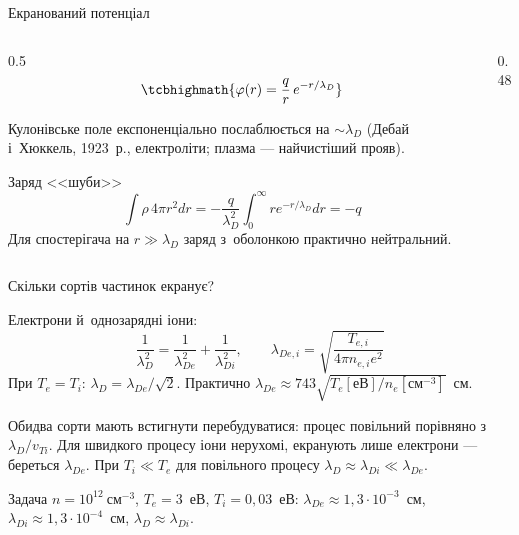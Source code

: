 \documentclass[]{beamer}
\newcommand{\cm}{\mathrm{см}}
\begin{document}
\begin{frame}{Екранований потенціал}
	\begin{columns}[T]
		\begin{column}{0.5\linewidth}
			\begin{equation*}
				\tcbhighmath{\varphi(r)=\frac qr\,e^{-r/\lambda_D}}
			\end{equation*}
			\begin{block}{}\justifying\scriptsize
				Кулонівське поле експоненціально послаблюється на $\sim\lambda_D$ (Дебай і~Хюккель, 1923~р.,
				електроліти; плазма --- найчистіший прояв).
			\end{block}
			\begin{block}{Заряд <<шуби>>}\justifying\scriptsize
				\begin{equation*}
					\int\rho\,4\pi r^2dr=-\frac q{\lambda_D^2}\int_0^\infty re^{-r/\lambda_D}dr=-q
				\end{equation*}
				Для спостерігача на $r\gg\lambda_D$ заряд з~оболонкою практично нейтральний.
			\end{block}
		\end{column}
		\begin{column}{0.48\linewidth}
			\centering
		\end{column}
	\end{columns}
\end{frame}

\begin{frame}{Скільки сортів частинок екранує?}
	\begin{block}{}\small
		Електрони й~однозарядні іони:
		\begin{equation*}
			\frac1{\lambda_D^2}=\frac1{\lambda_{De}^2}+\frac1{\lambda_{Di}^2},\qquad
			\lambda_{De,i}=\sqrt{\frac{T_{e,i}}{4\pi n_{e,i}e^2}}
		\end{equation*}
		\justifying
		При $T_e=T_i$: $\lambda_D=\lambda_{De}/\sqrt2$. Практично $\lambda_{De}\approx743\sqrt{T_e[\text{еВ}]/n_e[\cm^{-3}]}$~см.
	\end{block}
	\begin{alertblock}{}\justifying\small
		Обидва сорти мають встигнути перебудуватися: процес повільний порівняно з~$\lambda_D/v_{Ti}$.
		Для швидкого процесу іони нерухомі, екранують лише електрони --- береться $\lambda_{De}$.
		При $T_i\ll T_e$ для повільного процесу $\lambda_D\approx\lambda_{Di}\ll\lambda_{De}$.
	\end{alertblock}
	\begin{exampleblock}{Задача}\small
		$n=10^{12}~\cm^{-3}$, $T_e=3$~еВ, $T_i=0{,}03$~еВ: $\lambda_{De}\approx1{,}3\cdot10^{-3}$~см,
		$\lambda_{Di}\approx1{,}3\cdot10^{-4}$~см, $\lambda_D\approx\lambda_{Di}$.
	\end{exampleblock}
\end{frame}
\end{document}
